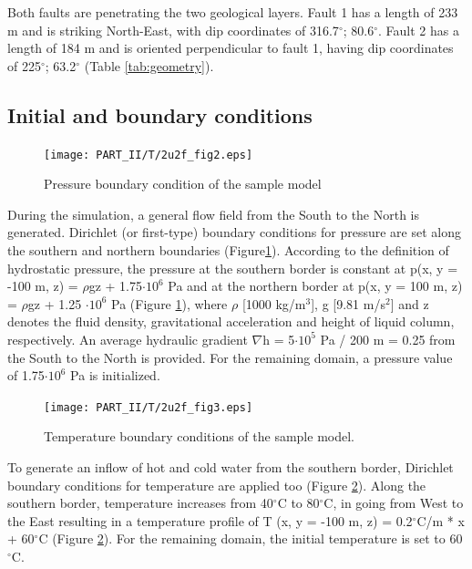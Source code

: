 Both faults are penetrating the two geological layers. Fault 1 has a length of 233 m and is striking North-East, with dip coordinates of 316.7$^\circ{}$; 80.6$^\circ{}$. Fault 2 has a length of 184 m and  is oriented perpendicular to fault 1, having dip coordinates of 225$^\circ{}$; 63.2$^\circ{}$ (Table \ref{tab:geometry}).

\subsection{Initial and boundary conditions}

\begin{figure}[htbp]
    \begin{center}
        \texttt{[image: PART\_II/T/2u2f\_fig2.eps]}
        \caption{Pressure boundary condition of the sample model}
        \label{fig2}
    \end{center}
\end{figure}

During the simulation, a general flow field from the South to the North is generated. Dirichlet (or first-type) boundary conditions for pressure are set along the southern and northern boundaries (Figure\ref{fig2}). According to the definition of hydrostatic pressure, the pressure at the southern border is constant at p(x, y = -100 m, z) = $\rho{}$gz + 1.75$\cdot10^{6}$ Pa and at the northern border at p(x, y = 100 m, z) = $\rho{}$gz + 1.25 $\cdot10^{6}$ Pa (Figure \ref{fig2}), where $\rho{}$ [1000 kg/m$^{3}$], g [9.81 m/s$^{2}$] and z denotes the fluid density, gravitational acceleration and height of liquid column, respectively. An average hydraulic gradient $\nabla{}$h = 5$\cdot10^{5}$ Pa / 200 m = 0.25 from the South to the North is provided. For the remaining domain, a pressure value of 
1.75$\cdot10^{6}$ Pa is initialized. 

\begin{figure}[htbp]
    \begin{center}
        \texttt{[image: PART\_II/T/2u2f\_fig3.eps]}
        \caption{Temperature boundary conditions of the sample model.} 
        \label{fig3}
    \end{center}
\end{figure}

To generate an inflow of hot and cold water from the southern border, Dirichlet boundary conditions for temperature are applied too (Figure \ref{fig3}). Along the southern border, temperature increases from 40$^\circ{}$C to 80$^\circ{}$C, in going from West to the East resulting in a temperature profile of T (x, y = -100 m, z) = 0.2$^\circ{}$C/m * x + 60$^\circ{}$C (Figure \ref{fig3}). For the remaining domain, the initial temperature is set to 60$^\circ{}$C.

